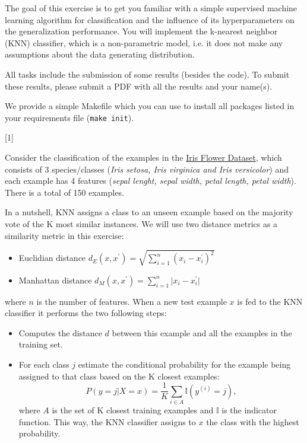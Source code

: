 \documentclass{exam}
\begin{document}
	\gccs
	The goal of this exercise is to get you familiar with a simple supervised machine learning algorithm for classification and the influence of its hyperparameters on the generalization performance. You will implement the k-nearest neighbor (KNN) classifier, which is a non-parametric model, i.e. it does not make any assumptions about the data generating distribution.
	
	\bigskip
	
	\noindent All tasks include the submission of some results (besides the code).
	To submit these results, please submit a PDF with all the results and your name(s).
	
	\noindent We provide a simple Makefile which you can use to install all packages listed in your requirements file (\texttt{make init}).
	
	
	\begin{questions}
		
		
		[1]
		
		Consider the classification of the examples in the \href{https://archive.ics.uci.edu/ml/datasets/Iris}{Iris Flower Dataset}, which consists of 3 species/classes (\textit{Iris setosa, Iris virginica and Iris versicolor}) and each example has 4 features (\textit{sepal lenght, sepal width, petal length, petal width}). There is a total of 150 examples.

		In a nutshell, KNN assigns a class to an unseen example based on the majority vote of the K most similar instances. We will use two distance metrics as a similarity metric in this exercise: 
		\begin{itemize}
			\item Euclidian distance $d_E(x, x^{\prime}) = \sqrt{\sum_{i=1}^n{(x_i - x_i^{\prime})^2}}$
			\item Manhattan distance $d_M(x, x^{\prime}) = \sum_{i=1}^n{\lvert x_i - x_i^{\prime} \rvert}$
		\end{itemize}
		 where $n$ is the number of features. When a new test example $x$ is fed to the KNN classifier it performs the two following steps:
		
		\begin{itemize}
			\item Computes the distance $d$ between this example and all the examples in the training set.
			\item For each class $j$ estimate the conditional probability for the example being assigned to that class based on the K closest examples: $$P(y=j|X=x) = \frac{1}{K}\sum_{i\in A}\mathbb{I}(y^{(i)}=j),$$where $A$ is the set of K closest training examples and $\mathbb{I}$ is the indicator function. This way, the KNN classifier assigns to $x$ the class with the highest probability.


\end{itemize}
\end{questions}
\end{document}
